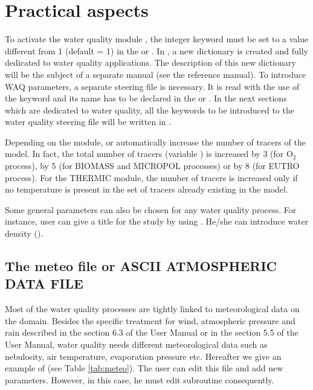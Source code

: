 \chapter{Practical aspects}

To activate the water quality module \waqtel, the integer keyword
 must be set to a value different from 1 (default = 1)
in the  or  .
In \waqtel, a new dictionary is created and fully dedicated to water quality applications.
The description of this new dictionary will be the subject of a separate manual
(see the \waqtel reference manual).
To introduce WAQ parameters, a separate steering file is necessary.
It is read with the use of the keyword 
and its name has to be declared in the  or 
.
In the next sections which are dedicated to water quality,
all the keywords to be introduced to the water quality steering file
will be written in .

Depending on the \waqtel module,  or 
automatically increase the number of tracers of the model.
In fact, the total number of tracers (variable )
is increased by 3 (for O$_2$ process), by 5 (for BIOMASS and MICROPOL processes)
or by 8 (for EUTRO process).
For the THERMIC module, the number of tracers is increased only
if no temperature is present in the set of tracers already existing in the model.

Some general parameters can also be chosen for any water quality process.
For instance, user can give a title for the study by using .
He/she can introduce water density ().


\section{The meteo file or ASCII ATMOSPHERIC DATA FILE}
\label{subs:meteo:file}
Most of the water quality processes are tightly linked to
meteorological data on the domain.
Besides the specific treatment for wind, atmospheric pressure
and rain described in the section 6.3 of the  User Manual
or in the section 5.5 of the  User Manual,
water quality needs different meteorological data such as
nebulosity, air temperature, evaporation pressure etc.
Hereafter we give an example of 
(see Table \ref{tab:meteo}).
The user can edit this file and add new parameters.
However, in this case, he must edit subroutine  consequently.

